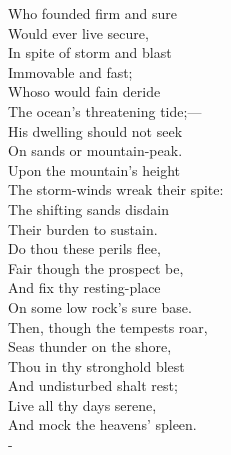 \documentclass[12pt]{book}
\newenvironment{ipoem}[1]%
  {\setcounter{poemindentevery}{#1}\begin{poem}\small}%
  {\end{poem}\setcounter{poemindentevery}{0}}
\begin{document}
\begin{ipoem}{0}
    Who founded firm and sure \\
    Would ever live secure, \\
    In spite of storm and blast \\
    Immovable and fast; \\
    Whoso would fain deride \\
    The ocean's threatening tide;--- \\
    His dwelling should not seek \\
    On sands or mountain-peak. \\
    Upon the mountain's height \\
    The storm-winds wreak their spite: \\
    The shifting sands disdain \\
    Their burden to sustain. \\
    Do thou these perils flee, \\
    Fair though the prospect be, \\
    And fix thy resting-place \\
    On some low rock's sure base. \\
    Then, though the tempests roar, \\
    Seas thunder on the shore, \\
    Thou in thy stronghold blest \\
    And undisturbed shalt rest; \\
    Live all thy days serene, \\
    And mock the heavens' spleen. \\-
\end{ipoem}
\end{document}
